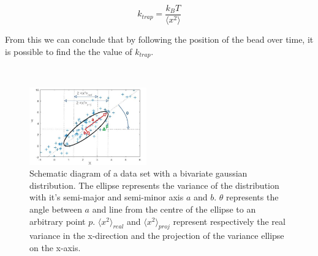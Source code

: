 \begin{equation}
	\label{eq_k_trap}
	k_{trap} = \frac{k_B T}{ \langle x^2 \rangle}
\end{equation}

From this we can conclude that by following the position of the bead over time, it is possible to find the the value of $k_{trap}$. 

\\

\begin{figure}
    \centering
    \includegraphics[width=0.45\textwidth,keepaspectratio]{figures/ellips.jpg}
    \caption{Schematic diagram of a data set with a bivariate gaussian distribution. The ellipse represents the variance of the distribution with it's semi-major and semi-minor axis $a$ and $b$. $\theta$ represents the angle between $a$ and line from the centre of the ellipse to an arbitrary point $p$. $\langle x^2 \rangle _{real}$ and $\langle x^2 \rangle _{proj}$ represent respectively the real variance in the x-direction and the projection of the variance ellipse on the x-axis.}
    \label{fig_ellipse}
\end{figure}


